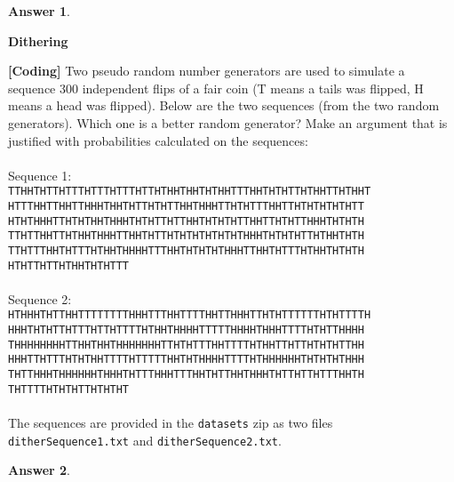 \documentclass[12pt]{article}
\renewcommand{\(}{\left(}
\renewcommand{\)}{\right)}
\theoremstyle{definition}
\newtheorem*{answer}{Answer}
\begin{document}
\begin{enumerate}
{\begin{shaded}
\begin{answer}
    \end{answer}
    \end{shaded}
    \pagebreak
    \textbf{Dithering}
    \item \textbf{[Coding]} Two pseudo random number generators are used to simulate a sequence 300 independent flips of a fair coin (T means a tails was flipped, H means a head was flipped). Below are the two sequences (from the two random generators). Which one is a better random generator? Make an argument that is justified with probabilities calculated on the sequences:\\ \\
    Sequence 1:\\
    \texttt{TTHHTHTTHTTTHTTTHTTTHTTHTHHTHHTHTHHTTTHHTHTHTTHTHHTTHTHHT\\
    HTTTHHTTHHTTHHHTHHTHTTHTHTTHHTHHHTTHTHTTTHHTTHTHTHTHTHTT\\
    HTHTHHHTTHTHTHHTHHHTHTHTTHTTHHTHTHTHTTHHTTHTHTTHHHTHTHTH\\
    TTHTTHHTTHTHHTHHHTTHHTHTTHTHTHTHTHTHTHHHTHTHTHTTHTHHTHTH\\
    TTHTTTHHTHTTTHTHHTHHHHTTTHHTHTHTHTHHHTTHHTHTTTHTHHTHTHTH\\
    HTHTTHTTHTHHTHTHTTT}\\ \\
    Sequence 2:\\
    \texttt{HTHHHTHTTHHTTTTTTTTHHHTTTHHTTTTHHTTHHHTTHTHTTTTTTHTHTTTTH\\
    HHHTHTHTTHTTTHTTHTTTTHTHHTHHHHTTTTTHHHHTHHHTTTTHTHTTHHHH\\
    THHHHHHHHTTHHTHHTHHHHHHHTTHTHTTTHHTTTTHTHHTTHTTHTHTHTTHH\\
    HHHTTHTTTHTHTHHTTTTHTTTTTHHTHTHHHHTTTTHTHHHHHHTHTHTHTHHH\\
    THTTHHHTHHHHHHTHHHTHTTTHHHTTTHHTHTTHHTHHHTHTTHTTHTTTHHTH\\
    THTTTTHTHTHTTHTHTHT}\\ \\
    The sequences are provided in the \texttt{datasets} zip as two files\\
    \texttt{ditherSequence1.txt} and \texttt{ditherSequence2.txt}.

    \begin{shaded}
    \begin{answer}
    

\end{answer}
\end{shaded}}
\end{enumerate}
\end{document}
